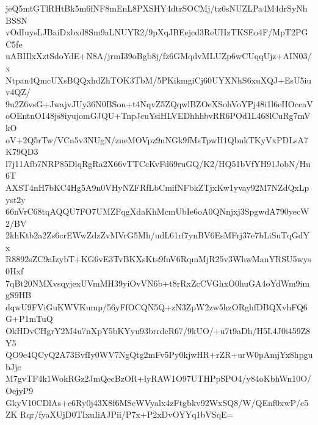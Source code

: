 jeQ5mtGTlRHtBk5m6fNF8mEnL8PXSHY4dtrSOCMj/tz6sNUZLPa4M4drSyNhBSSN
vOdIuysLJBaiDxbxd8Sm9aLNUYR2/9pXqJBEejcd3ReUHzTKSEo4F/MpT2PGC5fe
uABIIlxXztSdoYdE+N8A/jrmI39oBgb8j/fz6GMqdvMLUZp6wCUqqUjz+AIN03/x
Ntpan4QmcUXsBQQxhdZhTOK3TbM/5PKikmgiCj60UYXNhS6xuXQJ+EsU5iuv4QZ/
9u2Z6vsG+JwajvJUy36N0BSon+t4NqvZ5ZQqwlBZOeXSohVoYPj48i1l6eHOccaV
oOEntnO148js8iyujomGJQU+TnpJcuYsiHLVEDhhhbvRR6POd1L468lCuRg7mVkO
oV+2Q5rTw/VCn5v3NUgN/zneMOVpz9nNGk9fMsTpwH1QbnkTKyVxPDLsA7K79QD3
l7j11Afb7NRP85DlqRgRa2X66vTTCcKvFd69ruGQ/K2/HQ51bVfYH91JobN/Hu6T
AXST4nH7bKC4Hg5A9n0VHyNZFRfLbCmifNFbkZTjxKw1yvay92M7NZdQxLpyst2y
66nVrC68tqAQQU7FO7UMZFqgXdaKhMcmUbIe6oA0QNnjxj3SpgwdA790yecW2/BV
2khKtb2a2Zs6crEWwZdzZvMVrG5Mh/udL61rf7ynBV6EsMFrj37e7bLiSuTqGdYx
R8892sZC9aIzybT+KG6vE3TvBKXsKts9fnV6RqmMjR25v3WhwManYRSU5wys0Hxf
7qBt20NMXvsqyjexUVmMH39yiOvVN6b+t8rRxZcCVGhxO0huGA4oYdWm9imgS9HB
dqwU9FViGuKWVKump/56yFfOCQN5Q+zN3ZpW2zw5hzORghfDBQXvhFQ6G+P1mTuQ
OkHDvCHgrY2M4u7nXpY5bKYyu93brrdcR67/9kUO/+u7t9aDh/H5L4J0i459Z8Y5
QO9e4QCyQ2A73BvfIy0WV7NgQtg2mFv5Py0kjwHR+rZR+urW0pAmjYx8hpgubJjc
M7gvTF4k1WokRGz2JmQecBzOR+lyRAW1O97UTHPpSPO4/y84oKbhWn10O/OejyP9
GkyV10CDlAs+c6Ry0j43X8f6MScWVyalx4zFtgbkv92WxSQ8/W/QEnf0xwP/c5ZK
Rqr/fyaXUjD0TIxuIiAJPii/P7x+P2xDvOYYq1bVSqE=
